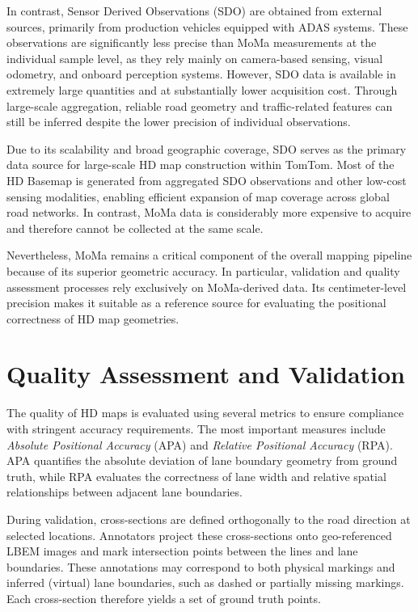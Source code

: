 In contrast, Sensor Derived Observations (SDO) are obtained from external sources, primarily from production vehicles equipped with ADAS systems. These observations are significantly less precise than MoMa measurements at the individual sample level, as they rely mainly on camera-based sensing, visual odometry, and onboard perception systems. However, SDO data is available in extremely large quantities and at substantially lower acquisition cost. Through large-scale aggregation, reliable road geometry and traffic-related features can still be inferred despite the lower precision of individual observations.

Due to its scalability and broad geographic coverage, SDO serves as the primary data source for large-scale HD map construction within TomTom. Most of the HD Basemap is generated from aggregated SDO observations and other low-cost sensing modalities, enabling efficient expansion of map coverage across global road networks. In contrast, MoMa data is considerably more expensive to acquire and therefore cannot be collected at the same scale.

Nevertheless, MoMa remains a critical component of the overall mapping pipeline because of its superior geometric accuracy. In particular, validation and quality assessment processes rely exclusively on MoMa-derived data. Its centimeter-level precision makes it suitable as a reference source for evaluating the positional correctness of HD map geometries.

\section{Quality Assessment and Validation}
\label{sec:quality}

The quality of HD maps is evaluated using several metrics to ensure compliance with stringent accuracy requirements. The most important measures include \textit{Absolute Positional Accuracy} (APA) and \textit{Relative Positional Accuracy} (RPA). APA quantifies the absolute deviation of lane boundary geometry from ground truth, while RPA evaluates the correctness of lane width and relative spatial relationships between adjacent lane boundaries.

During validation, cross-sections are defined orthogonally to the road direction at selected locations. Annotators project these cross-sections onto geo-referenced LBEM images and mark intersection points between the lines and lane boundaries. These annotations may correspond to both physical markings and inferred (virtual) lane boundaries, such as dashed or partially missing markings. Each cross-section therefore yields a set of ground truth points.

